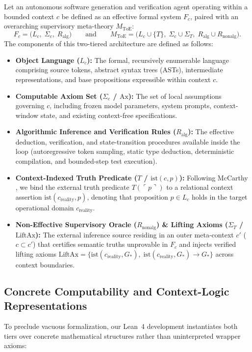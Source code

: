 \documentclass[11pt]{article}
\theoremstyle{plain}
\theoremstyle{definition}
\theoremstyle{remark}
\newcommand{\ist}{\mathrm{ist}}
\newcommand{\Ax}{\mathrm{Ax}}
\newcommand{\LiftAx}{\mathrm{LiftAx}}
\newcommand{\Rnonalg}{R_{\mathrm{nonalg}}}
\newcommand{\Ralg}{R_{\mathrm{alg}}}
\newcommand{\MToE}{M_{\mathrm{ToE}}}
\newcommand{\creal}{c_{\mathrm{reality}}}
\begin{document}
Let an autonomous software generation and verification agent operating within a
bounded context $c$ be defined as an effective formal system $F_c$, paired with
an overarching supervisory meta-theory $\MToE$:
\[
  F_c = \bigl(L_c,\; \Sigma_c,\; \Ralg\bigr)
  \qquad\text{and}\qquad
  \MToE = \bigl(L_c \cup \{T\},\; \Sigma_c \cup \Sigma_T,\; \Ralg \cup \Rnonalg\bigr).
\]
The components of this two-tiered architecture are defined as follows:
\begin{itemize}[leftmargin=1.4em]
  \item \textbf{Object Language ($L_c$):} The formal, recursively enumerable
    language comprising source tokens, abstract syntax trees (ASTs),
    intermediate representations, and base propositions expressible within
    context $c$.
  \item \textbf{Computable Axiom Set ($\Sigma_c$ / $\Ax$):} The set of local
    assumptions governing $c$, including frozen model parameters, system
    prompts, context-window state, and existing context-free specifications.
  \item \textbf{Algorithmic Inference and Verification Rules ($\Ralg$):} The
    effective deduction, verification, and state-transition procedures available
    inside the loop (autoregressive token sampling, static type deduction,
    deterministic compilation, and bounded-step test execution).
  \item \textbf{Context-Indexed Truth Predicate ($T$ / $\ist(c, p)$):} Following
    McCarthy \cite{mccarthy93}, we bind the external truth predicate
    $T(\ulcorner p \urcorner)$ to a relational context assertion
    $\ist(\creal, p)$, denoting that proposition $p \in L_c$ holds in the target
    operational domain $\creal$.
  \item \textbf{Non-Effective Supervisory Oracle ($\Rnonalg$) \& Lifting Axioms
    ($\Sigma_T$ / $\LiftAx$):} The external inference source residing in an outer
    meta-context $c'$ ($c \subset c'$) that certifies semantic truths unprovable
    in $F_c$ and injects verified lifting axioms
    $\LiftAx = \{\ist(\creal, G_*),\; \ist(\creal, G_*) \to G_*\}$ across context
    boundaries.
\end{itemize}

\subsection{Concrete Computability and Context-Logic Representations}

To preclude vacuous formalization, our Lean~4 development instantiates both
tiers over concrete mathematical structures rather than uninterpreted wrapper
axioms:
\end{document}
